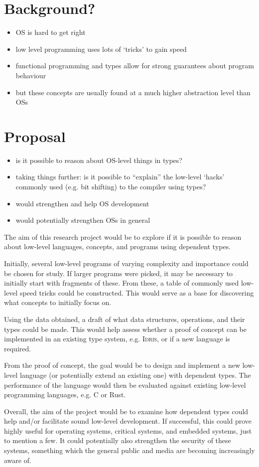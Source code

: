 \documentclass[11pt]{article}
\begin{document}
    \section*{Background?}
    \begin{itemize}
        \item OS is hard to get right
        \item low level programming uses lots of `tricks' to gain speed
        \item functional programming and types allow for strong guarantees about program behaviour
        \item but these concepts are usually found at a much higher abstraction level than OSs
    \end{itemize}
    
    \section*{Proposal}
    \begin{itemize}
        \item is it possible to reason about OS-level things in types?
        \item taking things further: is it possible to ``explain'' the low-level `hacks' commonly used (e.g. bit shifting) to the compiler using types?
        \item would strengthen and help OS development
        \item would potentially strengthen OSs in general
    \end{itemize}

    The aim of this research project would be to explore if it is possible to reason about low-level languages, concepts, and programs using dependent types.
    
    Initially, several low-level programs of varying complexity and importance could be chosen for study. If larger programs were picked, it may be necessary to initially start with fragments of these. From these, a table of commonly used low-level speed tricks could be constructed. This would serve as a base for discovering what concepts to initially focus on.
    
    Using the data obtained, a draft of what data structures, operations, and their types could be made. This would help assess whether a proof of concept can be implemented in an existing type system, e.g. \textsc{Idris}, or if a new language is required.
    
    From the proof of concept, the goal would be to design and implement a new low-level language (or potentially extend an existing one) with dependent types. The performance of the language would then be evaluated against existing low-level programming languages, e.g. C or Rust.
    
    Overall, the aim of the project would be to examine how dependent types could help and/or facilitate sound low-level development. If successful, this could prove highly useful for operating systems, critical systems, and embedded systems, just to mention a few. It could potentially also strengthen the security of these systems, something which the general public and media are becoming increasingly aware of.
    
\end{document}
